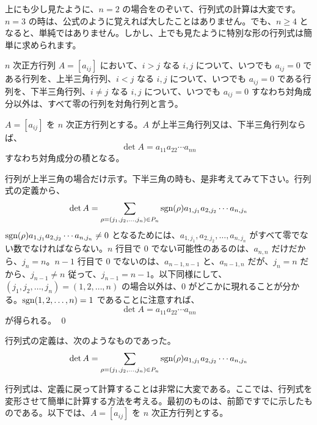 上にも少し見たように、$n =2$ の場合をのぞいて、行列式の計算は大変です。$n=3$ の時は、公式のように覚えれば大したことはありません。でも、$n\geq 4$ となると、単純ではありません。しかし、上でも見たように特別な形の行列式は簡単に求められます。

\begin{definition}
$n$ 次正方行列 $A = [a_{ij}]$ において、$i>j$ なる $i,j$ について、いつでも $a_{ij} = 0$ である行列を、{\gt 上半三角行列}、$i<j$ なる $i,j$ について、いつでも $a_{ij} = 0$ である行列を、{\gt 下半三角行列}、$i\neq j$ なる $i,j$  について、いつでも $a_{ij} = 0$ すなわち対角成分以外は、すべて零の行列を{\gt 対角行列}と言う。
\end{definition}

\begin{prop}
$A = [a_{ij}]$ を $n$ 次正方行列とする。$A$ が上半三角行列又は、下半三角行列ならば、
$$\det A = a_{11}a_{22}\cdots a_{nn}$$
すなわち対角成分の積となる。
\end{prop}
\proof
行列が上半三角の場合だけ示す。下半三角の時も、是非考えてみて下さい。行列式の定義から、
$$\det A = \sum_{\rho = (j_1,j_2,\ldots,j_n)\in P_n} \mbox{{\rm sgn}}(\rho)a_{1,j_1}a_{2,j_2}\cdots a_{n,j_n}$$
$\mbox{{\rm sgn}}(\rho)a_{1,j_1}a_{2,j_2}\cdots a_{n,j_n} \neq 0$ となるためには、$a_{1,j_1}, a_{2,j_2}, \ldots, a_{n,j_n}$ がすべて零でない数でなければならない。$n$ 行目で $0$ でない可能性のあるのは、$a_{n,n}$ だけだから、$j_n = n$。$n-1$ 行目で $0$ でないのは、$a_{n-1,n-1}$ と、$a_{n-1,n}$ だが、$j_n = n$ だから、$j_{n-1}\neq n$ 従って、$j_{n-1} = n-1$。以下同様にして、$(j_1, j_2, \ldots, j_n) = (1,2,\ldots, n)$ の場合以外は、$0$ がどこかに現れることが分かる。$\mbox{{\rm sgn}}(1,2,\ldots, n) = 1$ であることに注意すれば、
$$\det A = a_{11}a_{22}\cdots a_{nn}$$
が得られる。
\qed

\newpage
{}
行列式の定義は、次のようなものであった。
$$\det A = \sum_{\rho = (j_1,j_2,\ldots,j_n)\in P_n} \mbox{{\rm sgn}}(\rho)a_{1,j_1}a_{2,j_2}\cdots a_{n,j_n}$$

行列式は、定義に戻って計算することは非常に大変である。ここでは、行列式を変形させて簡単に計算する方法を考える。最初のものは、前節ですでに示したものである。以下では、$A = [a_{ij}]$ を $n$ 次正方行列とする。

